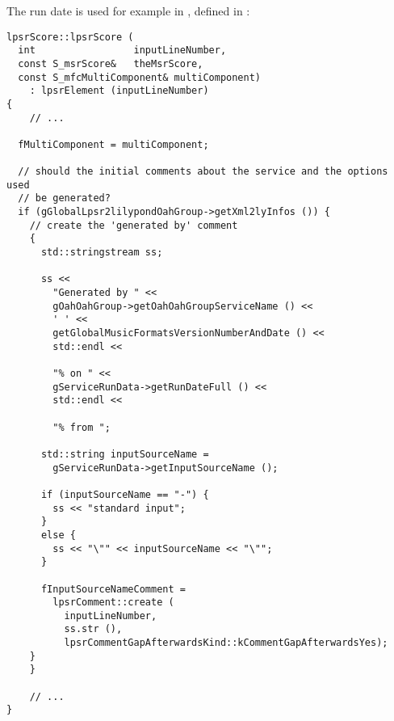 The run date is used for example in , defined in :%
\begin{lstlisting}[language=CPlusPlus]
lpsrScore::lpsrScore (
  int                 inputLineNumber,
  const S_msrScore&   theMsrScore,
  const S_mfcMultiComponent& multiComponent)
    : lpsrElement (inputLineNumber)
{
	// ...

  fMultiComponent = multiComponent;

  // should the initial comments about the service and the options used
  // be generated?
  if (gGlobalLpsr2lilypondOahGroup->getXml2lyInfos ()) {
    // create the 'generated by' comment
    {
      std::stringstream ss;

      ss <<
        "Generated by " <<
        gOahOahGroup->getOahOahGroupServiceName () <<
        ' ' <<
        getGlobalMusicFormatsVersionNumberAndDate () <<
        std::endl <<

        "% on " <<
        gServiceRunData->getRunDateFull () <<
        std::endl <<

        "% from ";

      std::string inputSourceName =
        gServiceRunData->getInputSourceName ();

      if (inputSourceName == "-") {
        ss << "standard input";
      }
      else {
        ss << "\"" << inputSourceName << "\"";
      }

      fInputSourceNameComment =
        lpsrComment::create (
          inputLineNumber,
          ss.str (),
          lpsrCommentGapAfterwardsKind::kCommentGapAfterwardsYes);
    }
	}

	// ...
}
\end{lstlisting}

